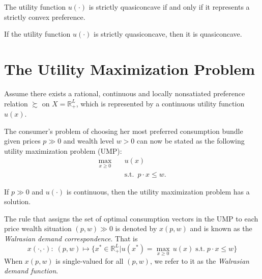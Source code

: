 \documentclass[12pt,fleqn]{book} %
\begin{document}
\begin{proposition}
	The utility function $u(\cdot)$ is strictly quasiconcave if and only if it represents a strictly convex preference.
\end{proposition}

\begin{proposition}
	If the utility function $u(\cdot)$ is strictly quasiconcave, then it is quasiconcave.
\end{proposition}


\section{The Utility Maximization Problem}

Assume there exists a rational, continuous and locally nonsatiated preference relation $\succsim$ on $X=\mathbb{R}_+^L$, which is represented by a continuous utility function $u(x)$. 

The consumer's problem of choosing her most preferred consumption bundle
given prices $p\gg 0$ and wealth level $w > 0$ can now be stated as the following utility maximization problem (UMP):
\begin{align*}
	\max_{x\ge 0} \quad & u(x) \\
	                    & \mathrm{s.t.}\ \; p\cdot x\le w.
\end{align*}

\begin{proposition}
	If $p\gg 0$ and $u(\cdot)$ is continuous, then the utility maximization problem has a solution.
\end{proposition}

\begin{definition}
	The rule that assigns the set of optimal consumption vectors in the UMP to each price wealth situation $(p, w)\gg 0$ is denoted by $x(p, w)$ and is known as the
	\emph{Walrasian demand correspondence}. That is
	\[
	x(\cdot,\cdot):\;(p,w)\mapsto \{x^*\in\mathbb{R}_+^L|u(x^*)=\max_{x\ge 0}\, u(x)\;\mathrm{s.t.}\; p\cdot x\le w\}
	\]	
	\noindent When $x(p, w)$ is single-valued for all $(p, w)$, we refer to it as the \emph{Walrasian demand function}.
	
\end{definition}
\end{document}

